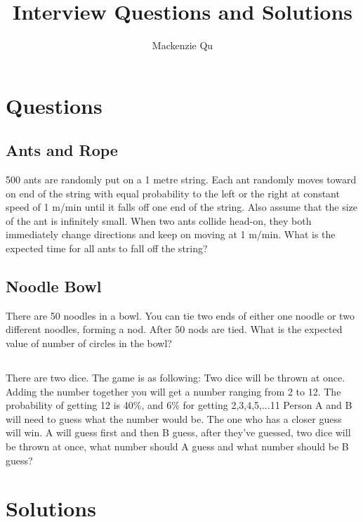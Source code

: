 \documentclass{article}
\begin{document}
\title{Interview Questions and Solutions}
\author{Mackenzie Qu}
\maketitle
\thispagestyle{empty}

\section{Questions}
\subsection{Ants and Rope}
{\large 500 ants are randomly put on a 1 metre string. 
Each ant randomly moves toward on end of the string with equal 
probability to the left or the right at constant speed of 1 m/min 
until it falls off one end of the string. 
Also assume that the size of the ant is infinitely small. 
When two ants collide head-on, they both immediately change directions 
and keep on moving at 1 m/min. 
What is the expected time for all ants to fall off the string?}

\subsection{Noodle Bowl}
\large{There are 50 noodles in a bowl. 
You can tie two ends of either one noodle or two different noodles, forming a nod.
After 50 nods are tied. What is the expected value of number of circles in the bowl?}
\subsection{}
\large{There are two dice. The game is as following: 
Two dice will be thrown at once. 
Adding the number together you will get a number ranging from 2 to 12.
The probability of getting 12 is 40\%, and 6\% for getting 2,3,4,5,...11
Person A and B will need to guess what the number would be. 
The one who has a closer guess will win.
A will guess first and then B guess, after they've guessed, 
two dice will be thrown at once, 
what number should A guess and what number should be B guess?}

\section{Solutions}
\end{document}

